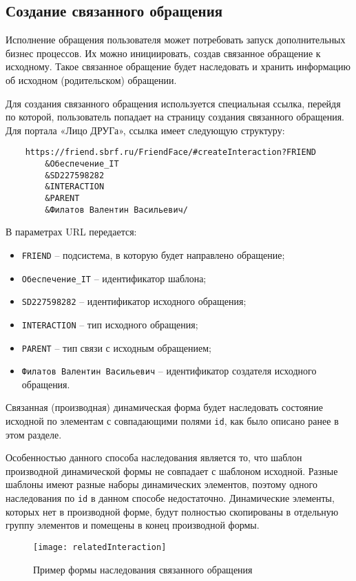 \documentclass[../index.tex]{subfiles}
\begin{document}
\subsection{Создание связанного обращения}
Исполнение обращения пользователя может потребовать запуск дополнительных бизнес процессов.
Их можно инициировать, создав связанное обращение к исходному.
Такое связанное обращение будет наследовать и хранить информацию об исходном (родительском) обращении.


Для создания связанного обращения используется специальная ссылка, перейдя по которой,
пользователь попадает на страницу создания связанного обращения.
Для портала «Лицо ДРУГа», ссылка имеет следующую структуру:


\begin{verbatim}
    https://friend.sbrf.ru/FriendFace/#createInteraction?FRIEND
        &Обеспечение_IT
        &SD227598282
        &INTERACTION
        &PARENT
        &Филатов Валентин Васильевич/
\end{verbatim}


В параметрах URL передается:
\begin{itemize}
    \item \verb|FRIEND| – подсистема, в которую будет направлено обращение;
    \item \verb|Обеспечение_IT| – идентификатор шаблона;
    \item \verb|SD227598282| – идентификатор исходного обращения;
    \item \verb|INTERACTION| – тип исходного обращения;
    \item \verb|PARENT| – тип связи с исходным обращением;
    \item \verb|Филатов Валентин Васильевич| – идентификатор создателя исходного обращения.
\end{itemize}


Связанная (производная) динамическая форма будет наследовать состояние исходной по элементам с
совпадающими полями \verb|id|, как было описано ранее в этом разделе.


Особенностью данного способа наследования является то,
что шаблон производной динамической формы не совпадает с шаблоном исходной.
Разные шаблоны имеют разные наборы динамических элементов,
поэтому одного наследования по \verb|id| в данном способе недостаточно.
Динамические элементы, которых нет в производной форме,
будут полностью скопированы в отдельную группу элементов и помещены в конец производной формы.

\begin{figure}[h]
    \texttt{[image: relatedInteraction]}
    \centering
    \caption{Пример формы наследования связанного обращения}
\end{figure}
\end{document}
